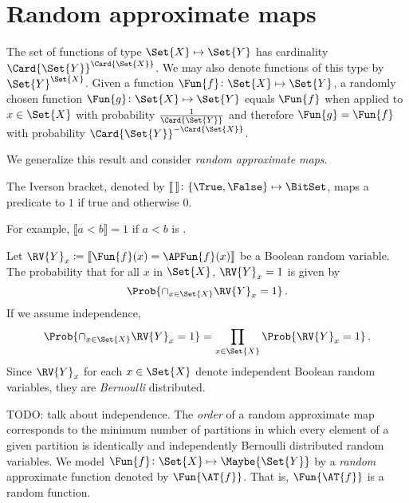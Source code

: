 \documentclass[ ../main.tex]{subfiles}
\begin{document}
\section{Random approximate maps}
The set of functions of type $\Set{X} \mapsto \Set{Y}$ has cardinality $\Card{\Set{Y}}^{\Card{\Set{X}}}$.
We may also denote functions of this type by $\Set{Y}^{\Set{X}}$.
Given a function $\Fun{f} \colon \Set{X} \mapsto \Set{Y}$, a randomly chosen function $\Fun{g} \colon \Set{X} \mapsto \Set{Y}$ equals $\Fun{f}$ when applied to $x \in \Set{X}$ with probability $\frac{1}{\Card{\Set{Y}}}$ and therefore $\Fun{g} = \Fun{f}$ with probability $\Card{\Set{Y}}^{-\Card{\Set{X}}}$.

We generalize this result and consider \emph{random approximate maps}.

\begin{definition}
The Iverson bracket, denoted by $\llbracket \, \rrbracket \colon \{\True,\False\} \mapsto \BitSet$, maps a predicate to $1$ if true and otherwise $0$.
\end{definition}
For example, $\llbracket a<b \rrbracket = 1$ if $a<b$ is \True.

Let $\RV{Y}_{x} \coloneqq \llbracket\Fun{f}(x)=\APFun{f}(x)\rrbracket$ be a Boolean random variable.
The probability that for all $x$ in $\Set{X}$, $\RV{Y}_{x} = 1$ is given by
\begin{equation}
	\Prob{\cap_{x \in \Set{X}} \RV{Y}_{x}=1}\,.
\end{equation}
If we assume independence,
\begin{equation}
	\Prob{\cap_{x \in \Set{X}} \RV{Y}_{x}=1} = \prod_{x \in \Set{X}} \Prob{\RV{Y}_{x}=1}\,.
\end{equation}
Since $\RV{Y}_{x}$ for each $x \in \Set{X}$ denote independent Boolean random variables, they are \emph{Bernoulli} distributed.

\begin{definition}
TODO: talk about independence.
The \emph{order} of a random approximate map corresponds to the minimum number of partitions in which every element of a given partition is identically and independently Bernoulli distributed random variables.
We model $\Fun{f} \colon \Set{X} \mapsto \Maybe{\Set{Y}}$ by a \emph{random} approximate function denoted by $\Fun{\AT{f}}$.
That is, $\Fun{\AT{f}}$ is a random function.
\end{definition}
\end{document}
